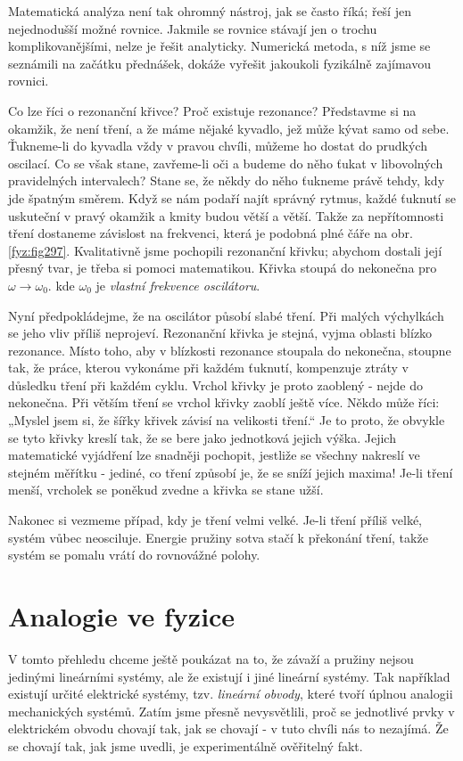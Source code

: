 {    Matematická analýza není tak ohromný nástroj, jak se často říká; řeší jen nejednodušší možné 
    rovnice. Jakmile se rovnice stávají jen o trochu komplikovanějšími, nelze je řešit analyticky. 
    Numerická metoda, s níž jsme se seznámili na začátku přednášek, dokáže vyřešit jakoukoli 
    fyzikálně zajímavou rovnici.
    
    Co lze říci o rezonanční křivce? Proč existuje rezonance? Představme si na okamžik, že není 
    tření, a že máme nějaké kyvadlo, jež může kývat samo od sebe. Ťukneme-li do kyvadla vždy v 
    pravou chvíli, můžeme ho dostat do prudkých oscilací. Co se však stane, zavřeme-li oči a budeme 
    do něho ťukat v libovolných pravidelných intervalech? Stane se, že někdy do něho ťukneme právě 
    tehdy, kdy jde špatným směrem. Když se nám podaří najít správný rytmus, každé ťuknutí se 
    uskuteční v pravý okamžik a kmity budou větší a větší. Takže za nepřítomnosti tření dostaneme 
    závislost na frekvenci, která je podobná plné čáře na obr. \ref{fyz:fig297}. Kvalitativně jsme 
    pochopili rezonanční křivku; abychom dostali její přesný tvar, je třeba si pomoci matematikou. 
    Křivka stoupá do nekonečna pro \(\omega\rightarrow\omega_0\). kde \(\omega_0\) je \emph{vlastní 
    frekvence oscilátoru}.
    
    Nyní předpokládejme, že na oscilátor působí slabé tření. Při malých výchylkách se jeho vliv 
    příliš neprojeví. Rezonanční křivka je stejná, vyjma oblasti blízko rezonance. Místo toho, aby 
    v blízkosti rezonance stoupala do nekonečna, stoupne tak, že práce, kterou vykonáme při každém 
    ťuknutí, kompenzuje ztráty v důsledku tření při každém cyklu. Vrchol křivky je proto zaoblený - 
    nejde do nekonečna. Při větším tření se vrchol křivky zaoblí ještě více. Někdo může říci: 
    „Myslel jsem si, že šířky křivek závisí na velikosti tření.“ Je to proto, že obvykle se tyto 
    křivky kreslí tak, že se bere jako jednotková jejich výška. Jejich matematické vyjádření lze 
    snadněji pochopit, jestliže se všechny nakreslí ve stejném měřítku - jediné, co tření způsobí 
    je, že se sníží jejich maxima! Je-li tření menší, vrcholek se poněkud zvedne a křivka se stane 
    užší.
    
    Nakonec si vezmeme případ, kdy je tření velmi velké. Je-li tření příliš velké, systém vůbec 
    neosciluje. Energie pružiny sotva stačí k překonání tření, takže systém se pomalu vrátí do 
    rovnovážné polohy.
    
  \section{Analogie ve fyzice}\label{fyz:IchapXXVsecIV}
    V tomto přehledu chceme ještě poukázat na to, že závaží a pružiny nejsou jedinými lineárními 
    systémy, ale že existují i jiné lineární systémy. Tak například existují určité elektrické 
    systémy, tzv. \emph{lineární obvody}, které tvoří úplnou analogii mechanických systémů. Zatím 
    jsme přesně nevysvětlili, proč se jednotlivé prvky v elektrickém obvodu chovají tak, jak se 
    chovají - v tuto chvíli nás to nezajímá. Že se chovají tak, jak jsme uvedli, je experimentálně 
    ověřitelný fakt.
    
}
